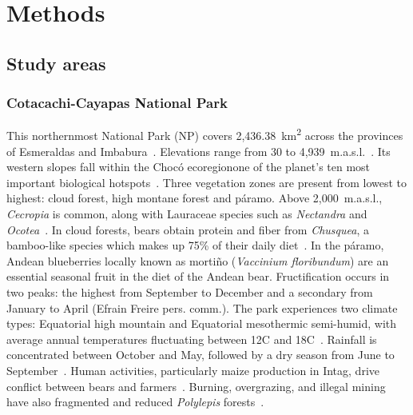 \documentclass[lineno,referee,pdflatex,sn-vancouver-num]{sn-jnl}%
\theoremstyle{thmstyleone}%
\theoremstyle{thmstyletwo}%
\theoremstyle{thmstylethree}%
\begin{document}
\section{Methods}

\subsection{Study areas}

\subsubsection{Cotacachi-Cayapas National Park}

This northernmost National Park (NP) covers 2,436.38~km\textsuperscript{2} across the provinces of Esmeraldas and Imbabura~\cite{ministeriodelambientePlanManejoReserva2007}. Elevations range from 30 to 4,939~m.a.s.l.~\cite{ministeriodelambientePlanManejoReserva2007}.
Its western slopes fall within the Choc\'{o} ecoregion\textemdash one of the planet's ten most important biological hotspots~\cite{myersBiodiversityHotspotsConservation2000}. Three vegetation zones are present from lowest to highest: cloud forest, high montane forest and páramo.
Above 2,000~m.a.s.l., \textit{Cecropia} is common, along with Lauraceae species such as \textit{Nectandra} and \textit{Ocotea}~\cite{castellanosGuiaParaRehabilitacion2010}.
In cloud forests, bears obtain protein and fiber from \textit{Chusquea}, a bamboo-like species which makes up 75\% of their daily diet~\cite{castellanosGuiaParaRehabilitacion2010}. In the páramo, Andean blueberries locally known as morti\~{n}o (\textit{Vaccinium floribundum}) are an essential seasonal fruit in the diet of the Andean bear.
Fructification occurs in two peaks: the highest from September to December and a secondary from January to April (Efrain Freire pers. comm.). The park experiences two climate types: Equatorial high mountain and Equatorial mesothermic semi-humid, with average annual temperatures fluctuating between 12{\textdegree}C and 18{\textdegree}C~\cite{ministeriodelambientePlanManejoReserva2007,hijmansVeryHighResolution2005}.
Rainfall is concentrated between October and May, followed by a dry season from June to September~\cite{hijmansVeryHighResolution2005}. Human activities, particularly maize production in Intag, drive conflict between bears and farmers~\cite{castellanosGuiaParaRehabilitacion2010}.
Burning, overgrazing, and illegal mining have also fragmented and reduced \textit{Polylepis} forests~\cite{ministeriodelambientePlanManejoReserva2007}.
\end{document}
